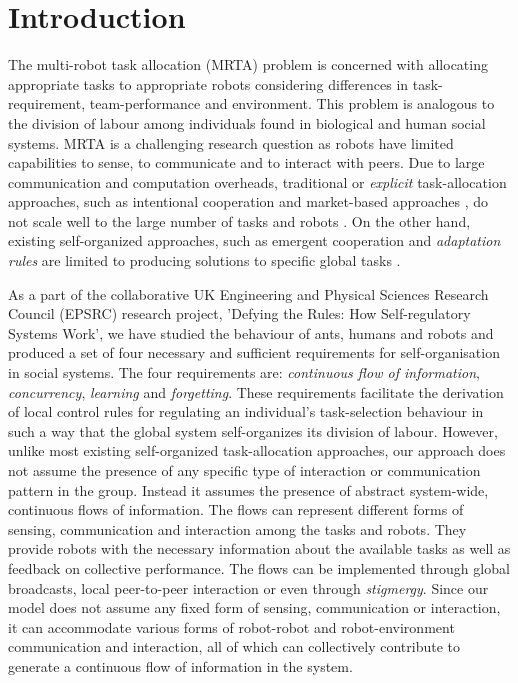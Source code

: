 \documentclass[smallcondensed]{svjour3}
\begin{document}
\section{Introduction}
\label{sec:intro}
The multi-robot task allocation (MRTA) problem is concerned with allocating appropriate tasks to appropriate robots considering differences in task-requirement, team-performance and environment.  This problem is analogous to the division of labour among individuals found in biological and human social systems.  MRTA is a challenging research question as robots have limited capabilities to sense, to communicate and to interact with peers.  Due to large communication and computation overheads, traditional or {\em explicit} task-allocation approaches, such as intentional cooperation \citep{Parker2008} and market-based approaches \citep{Dias+2006}, do not scale well to the large number of tasks and robots \citep{Lerman+2006}.  On the other hand, existing self-organized approaches, such as emergent cooperation \citep{Kube1997} and {\em adaptation rules} \citep{Liu+2007} are limited to producing solutions to specific global tasks \citep{Gerkey+2004}.

As a part of the collaborative UK Engineering and Physical Sciences Research Council (EPSRC) research project, 'Defying the Rules: How Self-regulatory Systems Work', we have studied the behaviour of ants, humans and robots and produced a set of four necessary and sufficient requirements for self-organisation in social systems.  The four requirements are: \textit{continuous flow of information}, \textit{concurrency}, \textit{learning} and \textit{forgetting}.  These requirements facilitate the derivation of local control rules for regulating an individual's task-selection behaviour in such a way that the global system self-organizes its division of labour.  However, unlike most existing self-organized task-allocation approaches, our approach does not assume the presence of any specific type of interaction or communication pattern in the group.  Instead it assumes the presence of abstract system-wide, continuous flows of information.  The flows can represent different forms of sensing, communication and interaction among the tasks and robots.  They provide robots with the necessary information about the available tasks as well as feedback on collective performance.  The flows can be implemented through global broadcasts, local peer-to-peer interaction or even through \textit{stigmergy}.  Since our model does not assume any fixed form of sensing, communication or interaction, it can accommodate various forms of robot-robot and robot-environment communication and interaction, all of which can collectively contribute to generate a continuous flow of information in the system.
\end{document}

